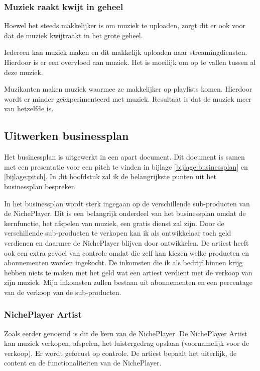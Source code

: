 \subsubsection*{Muziek raakt kwijt in geheel}
\begin{quotebox}
Hoewel het steeds makkelijker is om muziek te uploaden, zorgt dit er ook voor dat de muziek kwijtraakt in het grote geheel.
\end{quotebox}
\begin{todolist}
  \item Iedereen kan muziek maken en dit makkelijk uploaden naar streamingdiensten. Hierdoor is er een overvloed aan muziek. Het is moeilijk om op te vallen tussen al deze muziek.
  \item Muzikanten maken muziek waarmee ze makkelijker op playlists komen. Hierdoor wordt er minder geëxperimenteerd met muziek. Resultaat is dat de muziek meer van hetzelfde is.
\end{todolist}

\subsection {Uitwerken businessplan}

Het businessplan is uitgewerkt in een apart document. Dit document is samen met een presentatie voor een pitch te vinden in bijlage \ref{bijlage:businessplan} en \ref{bijlage:pitch}. In dit hoofdstuk zal ik de belangrijkste punten uit het businessplan bespreken.

In het businessplan wordt sterk ingegaan op de verschillende sub-producten van de NichePlayer. Dit is een belangrijk onderdeel van het businessplan omdat de kernfunctie, het afspelen van muziek, een gratis dienst zal zijn. Door de verschillende sub-producten te verkopen kan ik als ontwikkelaar toch geld verdienen en daarmee de NichePlayer blijven door ontwikkelen. De artiest heeft ook een extra gevoel van controle omdat die zelf kan kiezen welke producten en abonnementen worden ingekocht. De inkomsten die ik als bedrijf binnen krijg hebben niets te maken met het geld wat een artiest verdient met de verkoop van zijn muziek. Mijn inkomsten zullen bestaan uit abonnementen en een percentage van de verkoop van de sub-producten.

\subsubsection*{NichePlayer Artist}
Zoals eerder genoemd is dit de kern van de NichePlayer. De NichePlayer Artist kan muziek verkopen, afspelen, het luistergedrag opslaan (voornamelijk voor de verkoop). Er wordt gefocust op controle. De artiest bepaalt het uiterlijk, de content en de functionaliteiten van de NichePlayer.

